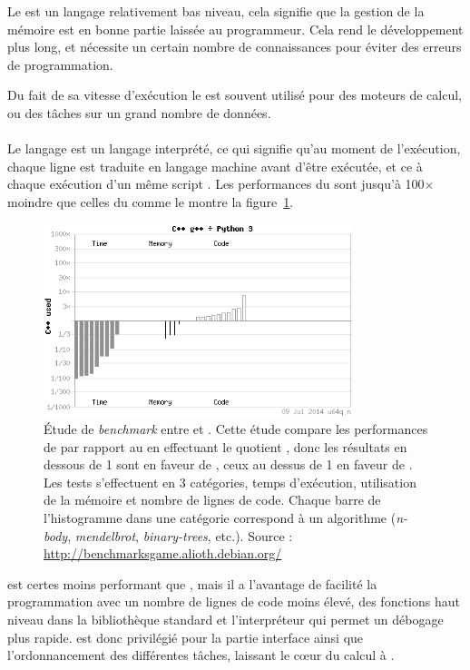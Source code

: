 Le \Cpp{} est un langage relativement bas niveau, cela signifie que la gestion de la mémoire est en bonne partie laissée au programmeur. Cela rend le développement plus long, et nécessite un certain nombre de connaissances pour éviter des erreurs de programmation.

Du fait de sa vitesse d'exécution le \Cpp{} est souvent utilisé pour des moteurs de calcul, ou des tâches sur un grand nombre de données.

			\paragraph{\Python}
Le langage \Python{} est un langage interprété, ce qui signifie qu'au moment de l'exécution, chaque ligne est traduite en langage machine avant d'être exécutée, et ce à chaque exécution d'un même script \Python. Les performances du \Python{} sont jusqu'à 100$\times$ moindre que celles du \Cpp{} comme le montre la figure~\ref{fig:cpp-py}.
	\begin{figure}
		\centering
		\includegraphics[width=0.8\textwidth]{img/cpp-py.png}
		\caption[\emph{Benchmark} entre \Cpp{} et \Python]{Étude de \emph{benchmark} entre \Cpp{} et \Python{}. Cette étude compare les performances de \Python{} par rapport au \Cpp{} en effectuant le quotient , donc les résultats en dessous de 1 sont en faveur de \Cpp{}, ceux au dessus de 1 en faveur de \Python{}. Les tests s'effectuent en 3 catégories, temps d'exécution, utilisation de la mémoire et nombre de lignes de code. Chaque barre de l'histogramme dans une catégorie correspond à un algorithme (\emph{n-body}, \emph{mendelbrot}, \emph{binary-trees}, etc.). Source : \url{http://benchmarksgame.alioth.debian.org/}}
		\label{fig:cpp-py}
	\end{figure}
\Python{} est certes moins performant que \Cpp{}, mais il a l'avantage de facilité la programmation avec un nombre de lignes de code moins élevé, des fonctions haut niveau dans la bibliothèque standard et l'interpréteur qui permet un débogage plus rapide. \Python{} est donc privilégié pour la partie interface ainsi que l'ordonnancement des différentes tâches, laissant le cœur du calcul à \Cpp{}.

